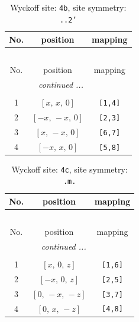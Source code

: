 \documentclass[fleqn,8pt]{jsarticle}
\begin{document}
\begin{longtable}{ccc}
\caption{Wyckoff site: {\tt 4b}, site symmetry: {\tt ..2'}}
 \\
 \hline \hline
No. & position & mapping \\ \hline \endfirsthead

\multicolumn{2}{l}{\tablename\ \thetable{}} \\
 \hline \hline
No. & position & mapping \\ \hline \endhead

 \hline \hline
\multicolumn{2}{r}{\footnotesize\it continued ...} \\ \endfoot

 \hline \hline
\multicolumn{2}{r}{} \\ \endlastfoot

1 & $\left[ x,\, x,\, 0 \right]$ & {\tt [1,4]} \\ \hline
2 & $\left[ - x,\, - x,\, 0 \right]$ & {\tt [2,3]} \\ \hline
3 & $\left[ x,\, - x,\, 0 \right]$ & {\tt [6,7]} \\ \hline
4 & $\left[ - x,\, x,\, 0 \right]$ & {\tt [5,8]} \\
\end{longtable}
\renewcommand{\arraystretch}{1.2}
\begin{longtable}{ccc}
\caption{Wyckoff site: {\tt 4c}, site symmetry: {\tt .m.}}
 \\
 \hline \hline
No. & position & mapping \\ \hline \endfirsthead

\multicolumn{2}{l}{\tablename\ \thetable{}} \\
 \hline \hline
No. & position & mapping \\ \hline \endhead

 \hline \hline
\multicolumn{2}{r}{\footnotesize\it continued ...} \\ \endfoot

 \hline \hline
\multicolumn{2}{r}{} \\ \endlastfoot

1 & $\left[ x,\, 0,\, z \right]$ & {\tt [1,6]} \\ \hline
2 & $\left[ - x,\, 0,\, z \right]$ & {\tt [2,5]} \\ \hline
3 & $\left[ 0,\, - x,\, - z \right]$ & {\tt [3,7]} \\ \hline
4 & $\left[ 0,\, x,\, - z \right]$ & {\tt [4,8]} \\
\end{longtable}
\renewcommand{\arraystretch}{1.2}
\end{document}
